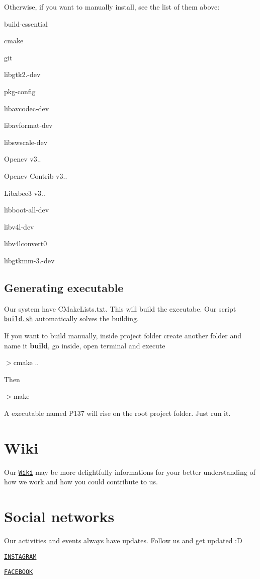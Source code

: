 Otherwise, if you want to manually install, see the list of them above\+:


\begin{DoxyItemize}
\item build-\/essential
\item cmake
\item git
\item libgtk2.-\/dev
\item pkg-\/config
\item libavcodec-\/dev
\item libavformat-\/dev
\item libswscale-\/dev
\item Opencv v3..
\item Opencv Contrib v3..
\item Libxbee3 v3..
\item libboot-\/all-\/dev
\item libv4l-\/dev
\item libv4lconvert0
\item libgtkmm-\/3.-\/dev
\end{DoxyItemize}

\subsection*{Generating executable}

Our system have C\+Make\+Lists.\+txt. This will build the executabe. Our script \href{https://github.com/PEQUI-VSSS/VSSS-INF/blob/master/build.sh}{\tt build.\+sh} automatically solves the building.

If you want to build manually, inside project folder create another folder and name it {\bfseries build}, go inside, open terminal and execute

$>$cmake ..

Then

$>$make

A executable named P137 will rise on the root project folder. Just run it.

\section*{Wiki}

Our \href{https://github.com/PEQUI-MEC/VSSS-INF/wiki}{\tt Wiki} may be more delightfully informations for your better understanding of how we work and how you could contribute to us.

\section*{Social networks}

Our activities and events always have updates. Follow us and get updated \+:D


\begin{DoxyItemize}
\item \href{https://www.instagram.com/pequimecanico/}{\tt I\+N\+S\+T\+A\+G\+R\+AM}
\item \href{https://www.facebook.com/NucleoPMec}{\tt F\+A\+C\+E\+B\+O\+OK} 
\end{DoxyItemize}